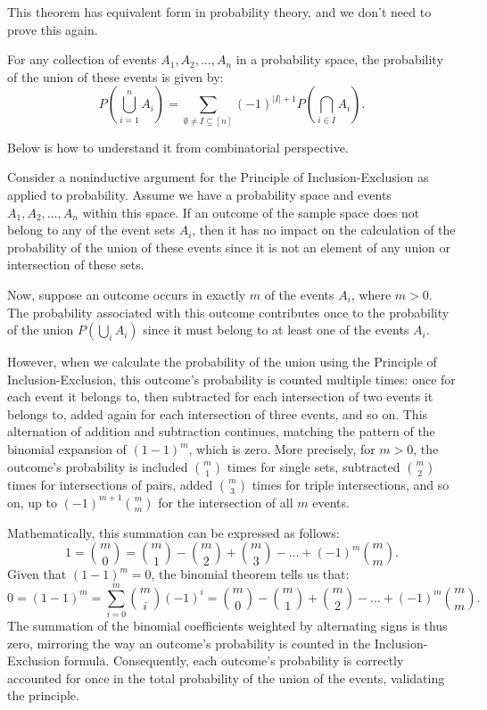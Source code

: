     This theorem has equivalent form in probability theory, and we don't need to prove this again.
    \begin{theorem}\label{PrIE}
        For any collection of events \( A_1, A_2, \ldots, A_n \) in a probability space, the probability of the union of these events is given by:
        \begin{equation}
        P\left(\bigcup_{i=1}^{n} A_i\right) = \sum_{\emptyset \neq I \subseteq [n]} (-1)^{|I|+1} P\left(\bigcap_{i \in I} A_i\right).
        \end{equation}
    \end{theorem}
    Below is how to understand it from combinatorial perspective.
    
        Consider a noninductive argument for the Principle of Inclusion-Exclusion as applied to probability. Assume we have a probability space and events \(A_1, A_2, \ldots, A_n\) within this space. If an outcome of the sample space does not belong to any of the event sets \(A_i\), then it has no impact on the calculation of the probability of the union of these events since it is not an element of any union or intersection of these sets.
        
        Now, suppose an outcome occurs in exactly \(m\) of the events \(A_i\), where \(m > 0\). The probability associated with this outcome contributes once to the probability of the union \(P(\bigcup_{i} A_i)\) since it must belong to at least one of the events \(A_i\).
        
        However, when we calculate the probability of the union using the Principle of Inclusion-Exclusion, this outcome's probability is counted multiple times: once for each event it belongs to, then subtracted for each intersection of two events it belongs to, added again for each intersection of three events, and so on. This alternation of addition and subtraction continues, matching the pattern of the binomial expansion of \((1 - 1)^m\), which is zero. More precisely, for \(m > 0\), the outcome's probability is included \( \binom{m}{1} \) times for single sets, subtracted \( \binom{m}{2} \) times for intersections of pairs, added \( \binom{m}{3} \) times for triple intersections, and so on, up to \( (-1)^{m+1}\binom{m}{m} \) for the intersection of all \(m\) events.
        
        Mathematically, this summation can be expressed as follows:
        \[
        1 = \binom{m}{0} = \binom{m}{1} - \binom{m}{2} + \binom{m}{3} - \ldots + (-1)^m\binom{m}{m}.
        \]
        Given that \( (1 - 1)^m = 0 \), the binomial theorem tells us that:
        \[
        0 = (1 - 1)^m = \sum_{i=0}^{m} \binom{m}{i}(-1)^i = \binom{m}{0} - \binom{m}{1} + \binom{m}{2} - \ldots + (-1)^m\binom{m}{m}.
        \]
        The summation of the binomial coefficients weighted by alternating signs is thus zero, mirroring the way an outcome's probability is counted in the Inclusion-Exclusion formula. Consequently, each outcome's probability is correctly accounted for once in the total probability of the union of the events, validating the principle.
    


